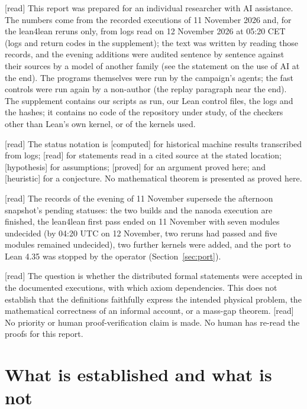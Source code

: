 \documentclass[11pt,a4paper]{article}
\theoremstyle{plain}
\theoremstyle{definition}
\theoremstyle{remark}
\numberwithin{equation}{section}
\newcommand{\st}[1]{\textsf{[#1]}}
\begin{document}
\st{read} This report was prepared for an individual researcher with AI assistance. The numbers come from the recorded
executions of 11 November 2026 and, for the lean4lean reruns only, from logs read on 12 November 2026 at 05:20 CET (logs and return codes in the supplement); the text was written by reading those records, and
the evening additions were audited sentence by sentence against their sources by a model of another family (see the statement on the use of AI at the end). The programs themselves were
run by the campaign's agents; the fast controls were run again by a non-author (the replay paragraph near the end).
The supplement contains our scripts as run, our Lean control files, the logs and the hashes; it contains no code of the
repository under study, of the checkers other than Lean's own kernel, or of the kernels used.

\st{read} The status notation is \st{computed} for historical machine results transcribed from logs;
\st{read} for statements read in a cited source at the stated location;
\st{hypothesis} for assumptions; \st{proved} for an argument proved here; and \st{heuristic} for a conjecture.
No mathematical theorem is presented as proved here.

\st{read} The records of the evening of 11 November supersede the afternoon snapshot's pending statuses: the two builds and
the nanoda execution are finished, the lean4lean first pass ended on 11 November with seven modules undecided (by 04:20 UTC on 12 November, two reruns had passed and five modules remained undecided), two further kernels were added, and the port to Lean 4.35 was stopped
by the operator (Section~\ref{sec:port}).

\st{read} The question is whether the distributed formal statements were accepted in the documented executions,
with which axiom dependencies. This does not establish that the definitions faithfully express the intended
physical problem, the mathematical correctness of an informal account, or a mass-gap theorem.
\st{read} No priority or human proof-verification claim is made. No human has re-read the proofs for this report.

\section{What is established and what is not}\label{sec:stmt}
\end{document}
